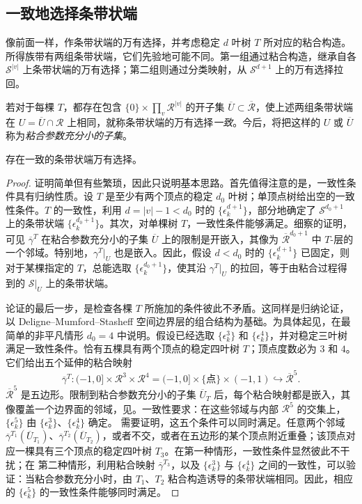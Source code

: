 \subsection{一致地选择条带状端}\label{sec:9g}
像前面一样，作条带状端的万有选择，并考虑稳定 $d$ 叶树 $T$ 所对应的粘合构造。所得族带有两组条带状端，它们先验地可能不同。第一组通过粘合构造，继承自各 $\mathcal S^{|v|}$ 上条带状端的万有选择；第二组则通过分类映射，从 $\mathcal S^{d+1}$ 上的万有选择拉回。
\begin{definition*}
若对于每棵 $T$，都存在包含 $\{0\}\times\prod_v\mathcal R^{|v|}$ 的开子集 $\overline U\subset\overline{\mathcal R}$，使上述两组条带状端在 $U=\overline U\cap\mathcal R$ 上相同，就称条带状端的万有选择\emph{一致}。今后，将把这样的 $U$ 或 $\overline U$ 称为\emph{粘合参数充分小的子集}。
\end{definition*}
\begin{lemma}\label{st:9.3}
存在一致的条带状端万有选择。
\end{lemma}
\begin{proof}
证明简单但有些繁琐，因此只说明基本思路。首先值得注意的是，一致性条件具有归纳性质。设 $T$ 是至少有两个顶点的稳定 $d_0$ 叶树；单顶点树给出空的一致性条件。$T$ 的一致性，利用 $d=|v|-1<d_0$ 时的 $\{\epsilon_k^{d+1}\}$，部分地确定了 $\mathcal S^{d_0+1}$ 上的条带状端 $\{\epsilon_k^{d_0+1}\}$。其次，对单棵树 $T$，一致性条件能够满足。细察的证明，可见 $\overline\gamma^T$ 在粘合参数充分小的子集
$\overline U$ 上的限制是开嵌入，其像为 $\overline{\mathcal R}^{d_0+1}$ 中 $T$-层的一个邻域。特别地，$\gamma^T|_U$ 也是嵌入。因此，假设 $d<d_0$ 时的 $\{\epsilon_k^{d+1}\}$ 已固定，则对于某棵指定的 $T$，总能选取 $\{\epsilon_k^{d_0+1}\}$，使其沿 $\gamma^T|_U$ 的拉回，等于由粘合过程得到的 $\mathcal S|_U$ 上的条带状端。

论证的最后一步，是检查各棵 $T$ 所施加的条件彼此不矛盾。这同样是归纳论证，以 Deligne–Mumford–Stasheff 空间边界层的组合结构为基础。为具体起见，在最简单的非平凡情形 $d_0=4$ 中说明。假设已经选取 $\{\epsilon_k^3\}$ 和 $\{\epsilon_k^4\}$，并对稳定三叶树满足一致性条件。恰有五棵具有两个顶点的稳定四叶树 $T$；顶点度数必为 $3$ 和 $4$。它们给出五个延伸的粘合映射
\[
\overline\gamma^T:(-1,0]\times\mathcal R^3\times\mathcal R^4
=(-1,0]\times\{\text{点}\}\times(-1,1)\hookrightarrow\overline{\mathcal R}^5.
\]
$\overline{\mathcal R}^5$ 是五边形。限制到粘合参数充分小的子集 $\overline U_T$ 后，每个粘合映射都是嵌入，其像覆盖一个边界面的邻域，见。一致性要求：在这些邻域与内部 $\mathcal R^5$ 的交集上，$\{\epsilon_k^5\}$ 由 $\{\epsilon_k^3\}$、$\{\epsilon_k^4\}$ 确定。
需要证明，这五个条件可以同时满足。任意两个邻域 $\overline\gamma^{T_1}(\overline U_{T_1})$、$\overline\gamma^{T_2}(\overline U_{T_2})$，或者不交，或者在五边形的某个顶点附近重叠；该顶点对应一棵具有三个顶点的稳定四叶树 $T_3$。在第一种情形，一致性条件显然彼此不干扰；在
第二种情形，利用粘合映射 $\overline\gamma^{T_3}$，以及 $\{\epsilon_k^3\}$ 与 $\{\epsilon_k^4\}$ 之间的一致性，可以验证：当粘合参数充分小时，由 $T_1$、$T_2$ 粘合构造诱导的条带状端相同。因此，相应的 $\{\epsilon_k^5\}$ 的一致性条件能够同时满足。
\end{proof}

